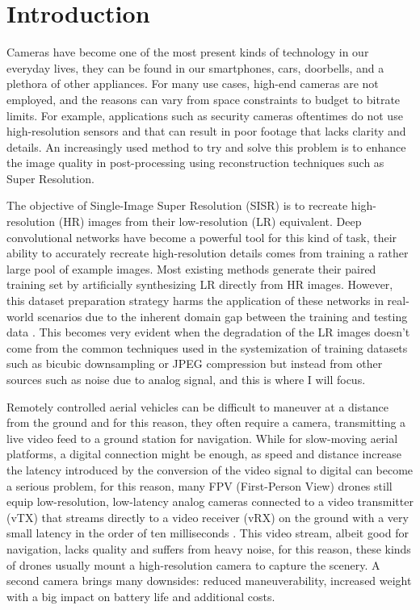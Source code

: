 \chapter{Introduction}
\label{cha:introduction}

Cameras have become one of the most present kinds of technology in our everyday lives, they can be found in our smartphones, cars, doorbells, and a plethora of other appliances. For many use cases, high-end cameras are not employed, and the reasons can vary from space constraints to budget to bitrate limits. For example, applications such as security cameras oftentimes do not use high-resolution sensors and that can result in poor footage that lacks clarity and details. An increasingly used method to try and solve this problem is to enhance the image quality in post-processing using reconstruction techniques such as Super Resolution.

The objective of Single-Image Super Resolution (SISR) is to recreate high-resolution (HR) images from their low-resolution (LR) equivalent.
Deep convolutional networks have become a powerful tool for this kind of task, their ability to accurately recreate high-resolution details comes from training a rather large pool of example images.
Most existing methods generate their paired training set by artificially synthesizing LR directly from HR images. However, this dataset preparation strategy harms the application of these networks in real-world scenarios due to the inherent domain gap between the training and testing data \cite{9711325}.
This becomes very evident when the degradation of the LR images doesn't come from the common techniques used in the systemization of training datasets such as bicubic downsampling or JPEG compression but instead from other sources such as noise due to analog signal, and this is where I will focus.

Remotely controlled aerial vehicles can be difficult to maneuver at a distance from the ground and for this reason, they often require a camera, transmitting a live video feed to a ground station for navigation. While for slow-moving aerial platforms, a digital connection might be enough, as speed and distance increase the latency introduced by the conversion of the video signal to digital can become a serious problem, for this reason, many FPV (First-Person View) drones still equip low-resolution, low-latency analog cameras connected to a video transmitter (vTX) that streams directly to a video receiver (vRX) on the ground with a very small latency in the order of ten milliseconds \cite{oscar}. This video stream, albeit good for navigation, lacks quality and suffers from heavy noise, for this reason, these kinds of drones usually mount a high-resolution camera to capture the scenery. A second camera brings many downsides: reduced maneuverability, increased weight with a big impact on battery life and additional costs.

